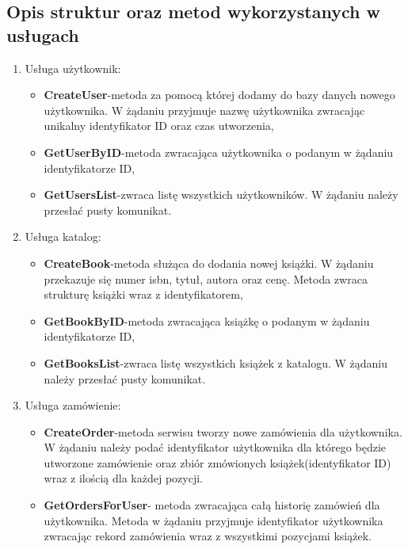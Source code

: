 \subsection{Opis struktur oraz metod wykorzystanych w usługach}
\par
\begin{enumerate}
    \item Usługa użytkownik:
          \begin{itemize}
              \item \textbf{CreateUser}-metoda za pomocą której dodamy do bazy danych nowego użytkownika. W żądaniu przyjmuje nazwę użytkownika zwracając unikalny identyfikator ID oraz czas utworzenia,
              \item \textbf{GetUserByID}-metoda zwracająca użytkownika o podanym w żądaniu identyfikatorze ID,
              \item \textbf{GetUsersList}-zwraca listę wszystkich użytkowników. W żądaniu należy przesłać pusty komunikat.
          \end{itemize}
          \newpage
    \item Usługa katalog:
          \begin{itemize}
              \item \textbf{CreateBook}-metoda służąca do dodania nowej książki. W żądaniu przekazuje się numer isbn, tytuł, autora oraz cenę. Metoda zwraca strukturę książki wraz z identyfikatorem,
              \item \textbf{GetBookByID}-metoda zwracająca książkę o podanym w żądaniu identyfikatorze ID,
              \item \textbf{GetBooksList}-zwraca listę wszystkich książek z katalogu. W żądaniu należy przesłać pusty komunikat.
          \end{itemize}
    \item Usługa zamówienie:
          \begin{itemize}
              \item \textbf{CreateOrder}-metoda serwisu tworzy nowe zamówienia dla użytkownika. W żądaniu należy podać identyfikator użytkownika dla którego będzie utworzone zamówienie oraz zbiór zmówionych książek(identyfikator ID) wraz z ilością dla każdej pozycji.
              \item \textbf{GetOrdersForUser}- metoda zwracająca całą historię zamówień dla użytkownika. Metoda w żądaniu
                    przyjmuje identyfikator użytkownika zwracając rekord zamówienia wraz z wszystkimi pozycjami książek.
          \end{itemize}
\end{enumerate}
